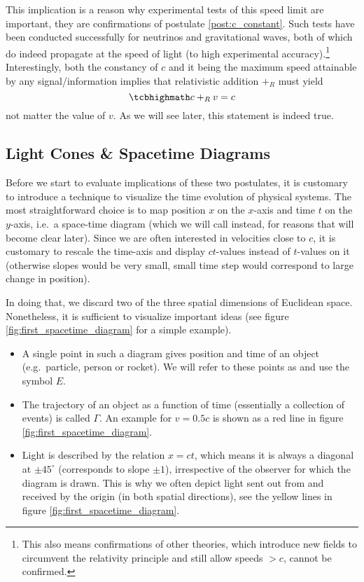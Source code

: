 This implication is a reason why experimental tests of this speed limit are important, they are confirmations of postulate \ref{post:c_constant}. Such tests have been conducted successfully for neutrinos and gravitational waves, both of which do indeed propagate at the speed of light (to high experimental accuracy).\footnote{This also means confirmations of other theories, which introduce new fields to circumvent the relativity principle and still allow speeds $> c$, cannot be confirmed.} Interestingly, both the constancy of $c$ and it being the maximum speed attainable by any signal/information implies that relativistic addition $+_R$ must yield
\begin{equation}
	\eqbox{
	c +_R v = c
	}
\end{equation}
not matter the value of $v$. As we will see later, this statement is indeed true.



		\subsection{Light Cones \& Spacetime Diagrams}
Before we start to evaluate implications of these two postulates, it is customary to introduce a technique to visualize the time evolution of physical systems. The most straightforward choice is to map position $x$ on the $x$-axis and time $t$ on the $y$-axis, i.e.~a space-time diagram (which we will call  instead, for reasons that will become clear later). Since we are often interested in velocities close to $c$, it is customary to rescale the time-axis and display $ct$-values instead of $t$-values on it (otherwise slopes would be very small, small time step would correspond to large change in position).

In doing that, we discard two of the three spatial dimensions of Euclidean space. Nonetheless, it is sufficient to visualize important ideas (see figure \ref{fig:first_spacetime_diagram} for a simple example).
\begin{itemize}
	\item A single point in such a diagram gives position and time of an object (e.g.~particle, person or rocket). We will refer to these points as  and use the symbol $E$.


	\item The trajectory of an object as a function of time (essentially a collection of events) is called  $\Gamma$. An example for $v = 0.5 c$ is shown as a red line in figure \ref{fig:first_spacetime_diagram}.


	\item Light is described by the relation $x = ct$, which means it is always a diagonal at $\pm 45^\circ$ (corresponds to slope $\pm 1$), irrespective of the observer for which the diagram is drawn. This is why we often depict light sent out from and received by the origin (in both spatial directions), see the yellow lines in figure \ref{fig:first_spacetime_diagram}.
\end{itemize}

